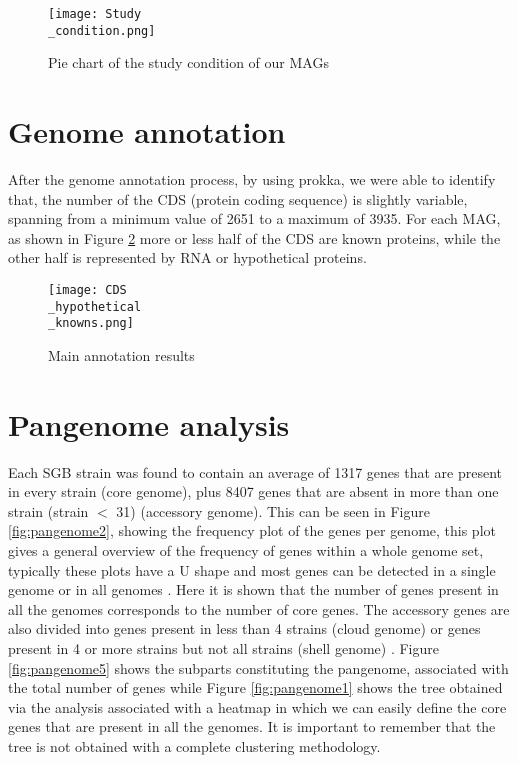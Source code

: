 \documentclass[a4paper,titlepage, oneside]{book}
\begin{document}
\begin{figure}[ht]
\centering
\texttt{[image: Study\\\_condition.png]}
\caption{Pie chart of the study condition of our MAGs}
\label{fig:studyCondition}
\end{figure}

\section{Genome annotation}
After the genome annotation process, by using prokka, we were able to identify that, the number of the CDS (protein coding sequence) is slightly variable, spanning from a minimum value of 2651 to a maximum of 3935. For each MAG, as shown in Figure \ref{fig:CDS} more or less half of the CDS are known proteins, while the other half is represented by RNA or hypothetical proteins.


\begin{figure}[ht]
\centering
\texttt{[image: CDS\\\_hypothetical\\\_knowns.png]}
\caption{Main annotation results}
\label{fig:CDS}
\end{figure}

\section{Pangenome analysis}



Each SGB strain was found to contain an average of 1317 genes that are present in every strain (core genome), plus 8407 genes that are absent in more than one strain (strain $<$ 31) (accessory genome). This can be seen in Figure \ref{fig:pangenome2}, showing the frequency plot of the genes per genome, this plot gives a general overview of the frequency of genes within a whole genome set, typically these plots have a U shape and most genes can be detected in a single genome or in all genomes \cite{Analysis-roary}. Here it is shown that the number of genes present in all the genomes corresponds to the number of core genes.
The accessory genes are also divided into genes present in less than 4 strains (cloud genome) or genes present in 4 or more strains but not all strains (shell genome) \cite{Medini}. Figure \ref{fig:pangenome5} shows the subparts constituting the pangenome, associated with the total number of genes while Figure \ref{fig:pangenome1} shows the tree obtained via the analysis associated with a heatmap in which we can easily define the core genes that are present in all the genomes. It is important to remember that the tree is not obtained with a complete clustering methodology.
\end{document}
